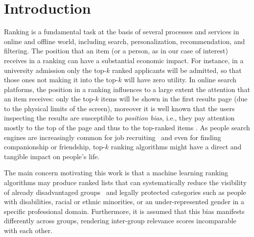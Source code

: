 \section{Introduction}\label{sec:introduction}
Ranking is a fundamental task at the basis of several processes and services in online and offline world, including search, personalization, recommendation, and filtering.
%
The position that an item (or a person, as in our case of interest) receives in a ranking can have a substantial economic impact.
%
For instance, in a university admission only the top-$k$ ranked applicants will be admitted, so that those ones not making it into the top-$k$ will have zero utility.
%
In online search platforms, the position in a ranking influences to a large extent the attention that an item receives: only the top-$k$ items will be shown in the first results page (due to the physical limits of the screen), moreover it is well known that the users inspecting the results are susceptible to \emph{position bias}, i.e., they pay attention mostly to the top of the page and thus to the top-ranked items \cite{CraswellZTR08}.
%
As people search engines are increasingly common for job recruiting~\cite{raghavan2020mitigating} and even for finding companionship or friendship, top-$k$ ranking algorithms might have a direct and tangible impact on people's life.


The main concern motivating this work is that a machine learning ranking algorithms may produce ranked lists that can systematically reduce the visibility of already disadvantaged groups~\cite{peder2008,Dwork2012} and legally protected categories such as people with disabilities, racial or ethnic minorities, or an under-represented gender in a specific professional domain.
%
%
Furthermore, it is assumed that this bias manifests differently across groups, rendering inter-group relevance scores incomparable with each other.

